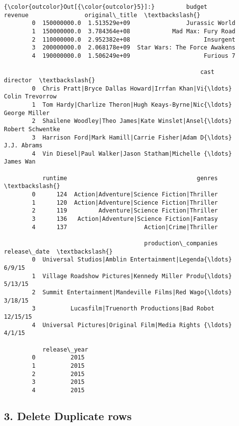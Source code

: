 \documentclass[11pt]{article}
\begin{document}
\begin{Verbatim}[commandchars=\\\{\}]
{\color{outcolor}Out[{\color{outcolor}5}]:}         budget       revenue                original\_title  \textbackslash{}
        0  150000000.0  1.513529e+09                Jurassic World   
        1  150000000.0  3.784364e+08            Mad Max: Fury Road   
        2  110000000.0  2.952382e+08                     Insurgent   
        3  200000000.0  2.068178e+09  Star Wars: The Force Awakens   
        4  190000000.0  1.506249e+09                     Furious 7   
        
                                                        cast          director  \textbackslash{}
        0  Chris Pratt|Bryce Dallas Howard|Irrfan Khan|Vi{\ldots}   Colin Trevorrow   
        1  Tom Hardy|Charlize Theron|Hugh Keays-Byrne|Nic{\ldots}     George Miller   
        2  Shailene Woodley|Theo James|Kate Winslet|Ansel{\ldots}  Robert Schwentke   
        3  Harrison Ford|Mark Hamill|Carrie Fisher|Adam D{\ldots}       J.J. Abrams   
        4  Vin Diesel|Paul Walker|Jason Statham|Michelle {\ldots}         James Wan   
        
           runtime                                     genres  \textbackslash{}
        0      124  Action|Adventure|Science Fiction|Thriller   
        1      120  Action|Adventure|Science Fiction|Thriller   
        2      119         Adventure|Science Fiction|Thriller   
        3      136   Action|Adventure|Science Fiction|Fantasy   
        4      137                      Action|Crime|Thriller   
        
                                        production\_companies release\_date  \textbackslash{}
        0  Universal Studios|Amblin Entertainment|Legenda{\ldots}       6/9/15   
        1  Village Roadshow Pictures|Kennedy Miller Produ{\ldots}      5/13/15   
        2  Summit Entertainment|Mandeville Films|Red Wago{\ldots}      3/18/15   
        3          Lucasfilm|Truenorth Productions|Bad Robot     12/15/15   
        4  Universal Pictures|Original Film|Media Rights {\ldots}       4/1/15   
        
           release\_year  
        0          2015  
        1          2015  
        2          2015  
        3          2015  
        4          2015  
\end{Verbatim}
            
    \subsection{3. Delete Duplicate rows}\label{delete-duplicate-rows}
\end{document}

